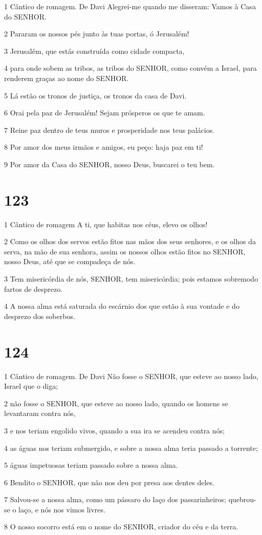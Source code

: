 \par 1 Cântico de romagem. De Davi Alegrei-me quando me disseram: Vamos à Casa do SENHOR.
\par 2 Pararam os nossos pés junto às tuas portas, ó Jerusalém!
\par 3 Jerusalém, que estás construída como cidade compacta,
\par 4 para onde sobem as tribos, as tribos do SENHOR, como convém a Israel, para renderem graças ao nome do SENHOR.
\par 5 Lá estão os tronos de justiça, os tronos da casa de Davi.
\par 6 Orai pela paz de Jerusalém! Sejam prósperos os que te amam.
\par 7 Reine paz dentro de teus muros e prosperidade nos teus palácios.
\par 8 Por amor dos meus irmãos e amigos, eu peço: haja paz em ti!
\par 9 Por amor da Casa do SENHOR, nosso Deus, buscarei o teu bem.

\chapter{123}

\par 1 Cântico de romagem A ti, que habitas nos céus, elevo os olhos!
\par 2 Como os olhos dos servos estão fitos nas mãos dos seus senhores, e os olhos da serva, na mão de sua senhora, assim os nossos olhos estão fitos no SENHOR, nosso Deus, até que se compadeça de nós.
\par 3 Tem misericórdia de nós, SENHOR, tem misericórdia; pois estamos sobremodo fartos de desprezo.
\par 4 A nossa alma está saturada do escárnio dos que estão à sua vontade e do desprezo dos soberbos.

\chapter{124}

\par 1 Cântico de romagem. De Davi Não fosse o SENHOR, que esteve ao nosso lado, Israel que o diga;
\par 2 não fosse o SENHOR, que esteve ao nosso lado, quando os homens se levantaram contra nós,
\par 3 e nos teriam engolido vivos, quando a sua ira se acendeu contra nós;
\par 4 as águas nos teriam submergido, e sobre a nossa alma teria passado a torrente;
\par 5 águas impetuosas teriam passado sobre a nossa alma.
\par 6 Bendito o SENHOR, que não nos deu por presa aos dentes deles.
\par 7 Salvou-se a nossa alma, como um pássaro do laço dos passarinheiros; quebrou-se o laço, e nós nos vimos livres.
\par 8 O nosso socorro está em o nome do SENHOR, criador do céu e da terra.


